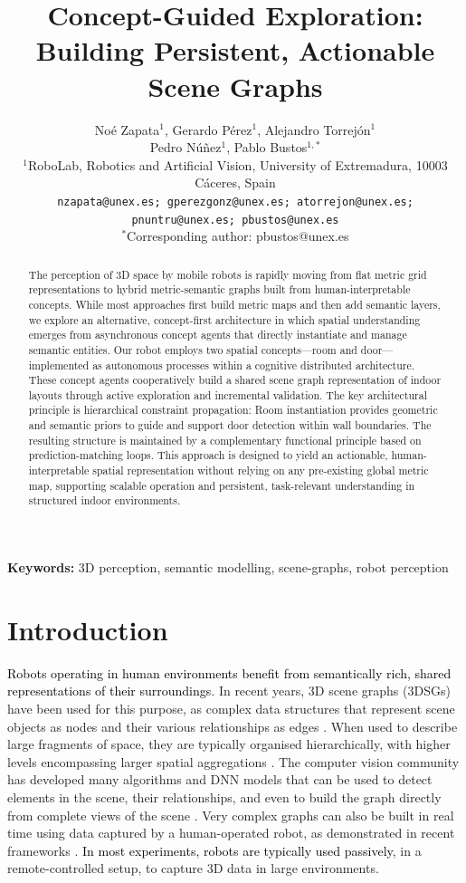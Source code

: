 \documentclass[10pt,a4paper]{article}
\title{Concept-Guided Exploration: Building Persistent, Actionable Scene Graphs}
\author{
Noé Zapata$^{1}$, Gerardo Pérez$^{1}$, Alejandro Torrejón$^{1}$\\
Pedro Núñez$^{1}$, Pablo Bustos$^{1,*}$\\[4pt]
\small $^{1}$RoboLab, Robotics and Artificial Vision, University of Extremadura, 10003 Cáceres, Spain\\
\small \texttt{nzapata@unex.es; gperezgonz@unex.es; atorrejon@unex.es; pnuntru@unex.es; pbustos@unex.es}\\
\small $^{*}$Corresponding author: pbustos@unex.es
}
\date{}
\begin{document}
\maketitle

\begin{abstract}
The perception of 3D space by mobile robots is rapidly moving from flat metric grid representations to hybrid metric-semantic graphs built from human-interpretable concepts. While most approaches first build metric maps and then add semantic layers, we explore an alternative, concept-first architecture in which spatial understanding emerges from asynchronous concept agents that directly instantiate and manage semantic entities. Our robot employs two spatial concepts—room and door—implemented as autonomous processes within a cognitive distributed architecture. These concept agents cooperatively build a shared scene graph representation of indoor layouts through active exploration and incremental validation. The key architectural principle is hierarchical constraint propagation: Room instantiation provides geometric and semantic priors to guide and support door detection within wall boundaries. The resulting structure is maintained by a complementary functional principle based on prediction-matching loops. This approach is designed to yield an actionable, human-interpretable spatial representation without relying on any pre-existing global metric map, supporting scalable operation and persistent, task-relevant understanding in structured indoor environments.
\end{abstract}

\noindent\textbf{Keywords:} 3D perception, semantic modelling, scene-graphs, robot perception



%

\section{Introduction}

\textcolor{black}{Robots operating in human environments benefit from semantically rich, shared representations of their surroundings}. In recent years, 3D scene graphs (3DSGs) have been used for this purpose, as complex data structures that represent scene objects as nodes and their various relationships as edges \cite{armeni20193dscenegraphstructure}. When used to describe large fragments of space, they are typically organised hierarchically, with higher levels encompassing larger spatial aggregations \cite{hughes2024foundations}. 
The computer vision community has developed many algorithms and DNN models that can be used to detect elements in the scene, their relationships, and even to build the graph directly from complete views of the scene \cite{wu2021scenegraphfusionincremental3dscene}
\cite{huang2018holistic}
\cite{Liu-2018}.
Very complex graphs can also be built in real time using data captured by a human-operated robot, as demonstrated in recent frameworks \cite{rosinol2021kimeraslamspatialperception}\cite{hughes2022hydra}. \textcolor{black}{In most experiments, robots are typically used passively}, in a remote-controlled setup, to capture 3D data in large environments. 
\end{document}
